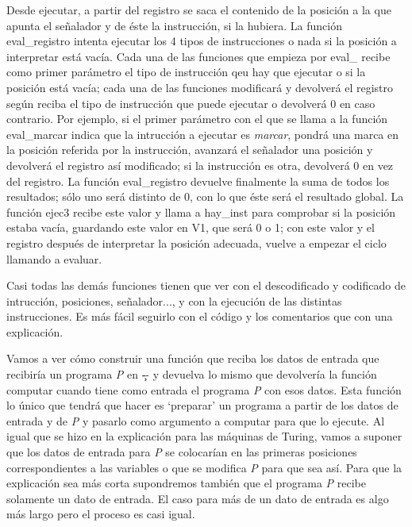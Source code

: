 Desde {\fgabrielen ejecutar}, a partir del registro se saca el contenido de la posición a la que
apunta el señalador y de éste la instrucción, si la hubiera. La función {\fgabrielen eval\_registro}
intenta ejecutar los 4 tipos de instrucciones o nada si la posición a interpretar está vacía. Cada
una de las funciones que empieza por {\fgabrielen eval\_} recibe como primer parámetro el tipo de
instrucción qeu hay que ejecutar o si la posición está vacía; cada una de las funciones modificará y
devolverá el registro según reciba el tipo de instrucción que puede ejecutar o devolverá 0 en caso
contrario. Por ejemplo, si el primer parámetro con el que se llama a la función {\fgabrielen
eval\_marcar} indica que la intrucción a ejecutar es {\it marcar}, pondrá una marca en la posición
referida por la instrucción, avanzará el señalador una posición y devolverá el registro así
modificado; si la instrucción es otra, devolverá 0 en vez del registro. La función {\fgabrielen
eval\_registro} devuelve finalmente la suma de todos los resultados; sólo uno será distinto de 0,
con lo que éste será el resultado global. La función {\fgabrielen ejec3} recibe este valor y llama a
{\fgabrielen hay\_inst} para comprobar si la posición estaba vacía, guardando este valor en
{\fgabrielen V1}, que será 0 o 1; con este valor y el registro después de interpretar la posición
adecuada, vuelve a empezar el ciclo llamando a {\fgabrielen evaluar}.

Casi todas las demás funciones tienen que ver con el descodificado y codificado de intrucción,
posiciones, señalador..., y con la ejecución de las distintas instrucciones. Es más fácil seguirlo
con el código y los comentarios que con una explicación.

%
Vamos a ver cómo construir una función que reciba los datos de entrada que recibiría un programa
{\it P} en \c-- y devuelva lo mismo que devolvería la función {\fgabrielen computar} cuando tiene
como entrada el programa {\it P} con esos datos. Esta función lo único que tendrá que hacer es
‘preparar’ un programa a partir de los datos de entrada y de {\it P} y pasarlo como argumento a
{\fgabrielen computar} para que lo ejecute. Al igual que se hizo en la explicación para las máquinas
de Turing, vamos a suponer que los datos de entrada para {\it P} se colocarían en las primeras
posiciones co\-rres\-pondientes a las variables o que se modifica {\it P} para que sea así. Para que la
explicación sea más corta supondremos también que el programa {\it P} recibe solamente un dato de
entrada. El caso para más de un dato de entrada es algo más largo pero el proceso es casi igual.

